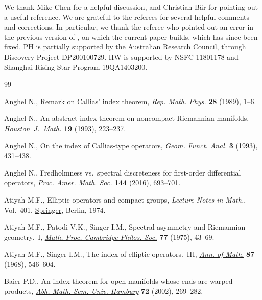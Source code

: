 \documentclass[10pt,a4paper]{amsart}
\numberwithin{equation}{section}
\begin{document}
We thank Mike Chen for a helpful discussion, and Christian B\"ar for pointing out a useful reference. We are grateful to the referees for several helpful comments and corrections. In particular, we thank the referee who pointed out an error in the previous version of \cite{HW21a}, on which the current paper builds, which has since been fixed.
PH is partially supported by the Australian Research Council, through Discovery Project DP200100729. HW is supported by NSFC-11801178 and Shanghai Rising-Star Program 19QA1403200.


\begin{thebibliography}{99}
\footnotesize\itemsep=0pt

Anghel N., Remark on {C}allias' index theorem, \href{https://doi.org/10.1016/0034-4877(89)90022-0}{\textit{Rep. Math. Phys.}}
 \textbf{28} (1989), 1--6.

Anghel N., An abstract index theorem on noncompact {R}iemannian manifolds,
 \textit{Houston~J.~Math.} \textbf{19} (1993), 223--237.

Anghel N., On the index of {C}allias-type operators, \href{https://doi.org/10.1007/BF01896237}{\textit{Geom. Funct.
 Anal.}} \textbf{3} (1993), 431--438.

Anghel N., Fredholmness vs.\ spectral discreteness for first-order differential
 operators, \href{https://doi.org/10.1090/proc12741}{\textit{Proc. Amer. Math. Soc.}} \textbf{144} (2016), 693--701.

Atiyah M.F., Elliptic operators and compact groups, \textit{Lecture Notes in
 Math.}, Vol.~401, \href{https://doi.org/10.1007/BFb0057821}{Springer}, Berlin, 1974.

Atiyah M.F., Patodi V.K., Singer I.M., Spectral asymmetry and {R}iemannian
 geometry.~{I}, \href{https://doi.org/10.1017/S0305004100049410}{\textit{Math. Proc. Cambridge Philos. Soc.}} \textbf{77}
 (1975), 43--69.

Atiyah M.F., Singer I.M., The index of elliptic operators.~{III}, \href{https://doi.org/10.2307/1970717}{\textit{Ann.
 of Math.}} \textbf{87} (1968), 546--604.

Baier P.D., An index theorem for open manifolds whose ends are warped products,
 \href{https://doi.org/10.1007/BF02941677}{\textit{Abh. Math. Sem. Univ. Hamburg}} \textbf{72} (2002), 269--282.


\end{thebibliography}
\end{document}
